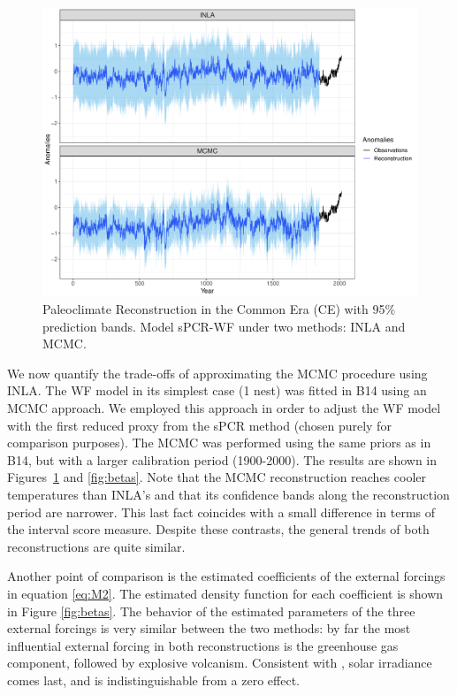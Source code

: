 \documentclass[12pt]{amsart}
\theoremstyle{plain}
\theoremstyle{definition}
\theoremstyle{remark}
\begin{document}
\begin{figure}[h!]
  \centering
  \includegraphics[scale=0.40]{RecCE_MCMC}
  \caption{Paleoclimate Reconstruction in the Common Era (CE) with 95\%
    prediction bands. Model sPCR-WF under two methods: INLA and MCMC.}
  \label{fig:paleoCE4}
\end{figure}

We now quantify the trade-offs of approximating the MCMC procedure using INLA. The WF model in its simplest case (1 nest) was fitted in B14
using an MCMC approach. We employed this approach in order to adjust the
WF model with the first reduced proxy from the sPCR method (chosen purely
for comparison purposes). The MCMC was performed using the
same priors as in B14, but with a larger calibration period
(1900-2000). The results are shown in Figures~\ref{fig:paleoCE4} and
\ref{fig:betas}. Note that the MCMC reconstruction reaches cooler temperatures
than INLA's and that its confidence bands along the reconstruction period are
narrower. This last fact coincides with a small difference in terms of the
interval score measure. Despite these contrasts, the general trends of both reconstructions are quite similar. 

Another point of comparison is the estimated coefficients of the
external forcings in equation \eqref{eq:M2}. The estimated density function
for each coefficient is shown in Figure \ref{fig:betas}. The behavior of the
estimated parameters of the three external forcings is very similar between the
two methods: by far the most influential external forcing in
both reconstructions is the greenhouse gas component, followed by explosive volcanism. Consistent with \citet{Schurer2013b}, solar irradiance comes last, and is indistinguishable from a zero effect. 
\end{document}
